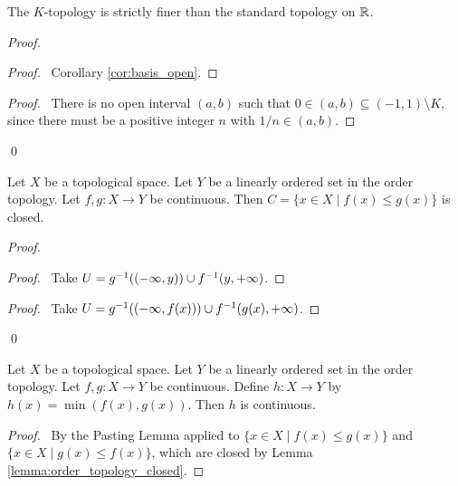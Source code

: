 \begin{lemma}
    The $K$-topology is strictly finer than the standard topology on $\mathbb{R}$.
\end{lemma}

\begin{proof}
    \pf
    \begin{proof}
        \pf\ Corollary \ref{cor:basis_open}.
    \end{proof}
    \begin{proof}
        \pf\ There is no open interval $(a,b)$ such that $0 \in (a,b) \subseteq (-1,1) \setminus K$, since
        there must be a positive integer $n$ with $1/n \in (a,b)$.
    \end{proof}
    \qed
\end{proof}

\begin{lemma}
    \label{lemma:order_topology_closed}
    Let $X$ be a topological space.
    Let $Y$ be a linearly ordered set in the order topology. Let $f, g : X \rightarrow Y$ be continuous. Then $C = \{ x \in X \mid f(x) \leq g(x) \}$ is closed.
\end{lemma}

\begin{proof}
    \pf
    \begin{proof}
        \pf\ Take $U = {g}^{-1}((-\infty, y)) \cup {f}^{-1}(y,+\infty)$.
    \end{proof}
    \begin{proof}
        \pf\ Take $U = {g}^{-1}((-\infty, f(x))) \cup {f}^{-1}(g(x),+\infty)$.
    \end{proof}
    \qed
\end{proof}

\begin{proposition}
    Let $X$ be a topological space.
    Let $Y$ be a linearly ordered set in the order topology. Let $f, g : X \rightarrow Y$ be continuous. Define $h : X \rightarrow Y$ by $h(x) = \min(f(x),g(x))$.
    Then $h$ is continuous.
\end{proposition}

\begin{proof}
    \pf\ By the Pasting Lemma applied to $\{ x \in X \mid f(x) \leq g(x) \}$ and $\{ x \in X \mid g(x) \leq f(x) \}$, which are closed by Lemma \ref{lemma:order_topology_closed}.
\end{proof}

